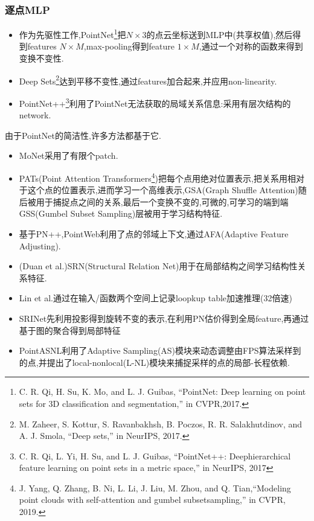 \documentclass{article}
\begin{document}
\subsubsection{逐点MLP}

\begin{itemize}
    \item 作为先驱性工作,PointNet\footnote{C. R. Qi, H. Su, K. Mo, and L. J. Guibas, “PointNet: Deep learning on point sets for 3D classification and segmentation,” in CVPR,2017.}把$N\times 3$的点云坐标送到MLP中(共享权值),然后得到features $N\times M$,max-pooling得到feature $1\times M$,通过一个对称的函数来得到变换不变性. 
    \item Deep Sets\footnote{M. Zaheer, S. Kottur, S. Ravanbakhsh, B. Poczos, R. R. Salakhutdinov, and A. J. Smola, “Deep sets,” in NeurIPS, 2017.}达到平移不变性,通过features加合起来,并应用non-linearity.
    \item PointNet++\footnote{C. R. Qi, L. Yi, H. Su, and L. J. Guibas, “PointNet++: Deephierarchical feature learning on point sets in a metric space,” in
    NeurIPS, 2017}利用了PointNet无法获取的局域关系信息:采用有层次结构的network.
\end{itemize}

由于PointNet的简洁性,许多方法都基于它.
\begin{itemize}
    \item MoNet采用了有限个patch.
    \item PATs(Point Attention Transformers\footnote{J. Yang, Q. Zhang, B. Ni, L. Li, J. Liu, M. Zhou, and Q. Tian,“Modeling point clouds with self-attention and gumbel subsetsampling,” in CVPR, 2019.})把每个点用绝对位置表示,把关系用相对于这个点的位置表示,进而学习一个高维表示,GSA(Graph Shuffle Attention)随后被用于捕捉点之间的关系,最后一个变换不变的,可微的,可学习的端到端GSS(Gumbel Subset Sampling)层被用于学习结构特征.
    \item 基于PN++,PointWeb利用了点的邻域上下文,通过AFA(Adaptive Feature Adjusting).
    \item (Duan et al.)SRN(Structural Relation Net)用于在局部结构之间学习结构性关系特征.
    \item Lin et al.通过在输入/函数两个空间上记录loopkup table加速推理(32倍速)
    \item SRINet先利用投影得到旋转不变的表示,在利用PN估价得到全局feature,再通过基于图的聚合得到局部特征
    \item PointASNL利用了Adaptive Sampling(AS)模块来动态调整由FPS算法采样到的点,并提出了local-nonlocal(L-NL)模块来捕捉采样的点的局部-长程依赖.
\end{itemize}
\end{document}
